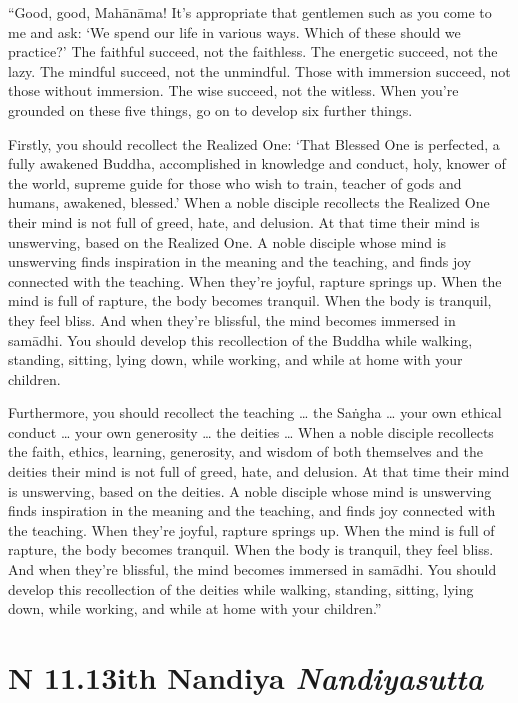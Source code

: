 \documentclass[12pt,openany]{book}%
\newcommand*{\suttatitleacronym}[1]{\smaller[2]{#1}\vspace*{.3em}}
\newcommand*{\suttatitletranslation}[1]{\linebreak{#1}}
\newcommand*{\suttatitleroot}[1]{\linebreak\smaller[2]\itshape{#1}}
\newcommand*{\tocacronym}[1]{\hspace*{-3.3em}{#1}\quad}
\newcommand*{\toctranslation}[1]{#1}
\newcommand*{\tocroot}[1]{(\textit{#1})}
\begin{document}
“Good, good, \textsanskrit{Mahānāma}! It’s appropriate that gentlemen such as you come to me and ask: ‘We spend our life in various ways. Which of these should we practice?’ The faithful succeed, not the faithless. The energetic succeed, not the lazy. The mindful succeed, not the unmindful. Those with immersion succeed, not those without immersion. The wise succeed, not the witless. When you’re grounded on these five things, go on to develop six further things. 

Firstly, you should recollect the Realized One: ‘That Blessed One is perfected, a fully awakened Buddha, accomplished in knowledge and conduct, holy, knower of the world, supreme guide for those who wish to train, teacher of gods and humans, awakened, blessed.’ When a noble disciple recollects the Realized One their mind is not full of greed, hate, and delusion. At that time their mind is unswerving, based on the Realized One. A noble disciple whose mind is unswerving finds inspiration in the meaning and the teaching, and finds joy connected with the teaching. When they’re joyful, rapture springs up. When the mind is full of rapture, the body becomes tranquil. When the body is tranquil, they feel bliss. And when they’re blissful, the mind becomes immersed in \textsanskrit{samādhi}. You should develop this recollection of the Buddha while walking, standing, sitting, lying down, while working, and while at home with your children. 

Furthermore, you should recollect the teaching … the \textsanskrit{Saṅgha} … your own ethical conduct … your own generosity … the deities … When a noble disciple recollects the faith, ethics, learning, generosity, and wisdom of both themselves and the deities their mind is not full of greed, hate, and delusion. At that time their mind is unswerving, based on the deities. A noble disciple whose mind is unswerving finds inspiration in the meaning and the teaching, and finds joy connected with the teaching. When they’re joyful, rapture springs up. When the mind is full of rapture, the body becomes tranquil. When the body is tranquil, they feel bliss. And when they’re blissful, the mind becomes immersed in \textsanskrit{samādhi}. You should develop this recollection of the deities while walking, standing, sitting, lying down, while working, and while at home with your children.” 

%
\section*{{\suttatitleacronym AN 11.13}{\suttatitletranslation With Nandiya }{\suttatitleroot Nandiyasutta}}
\addcontentsline{toc}{section}{\tocacronym{AN 11.13} \toctranslation{With Nandiya } \tocroot{Nandiyasutta}}
\end{document}
